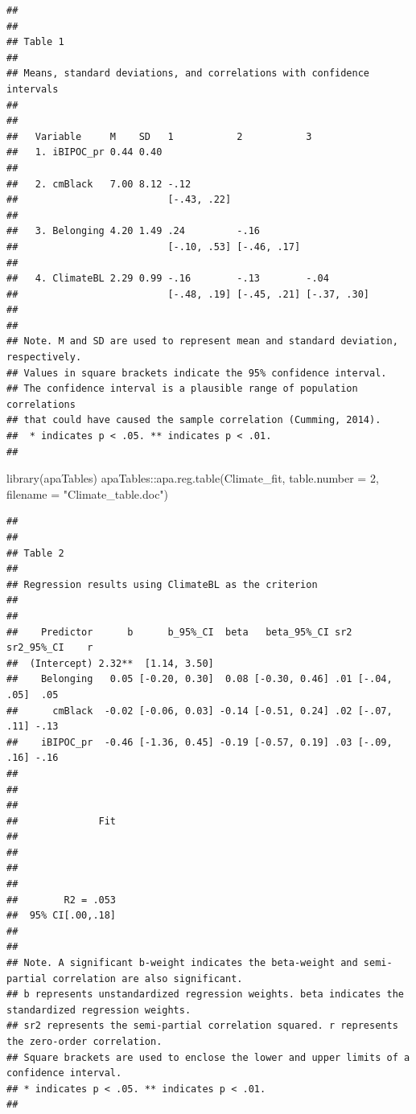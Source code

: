 \documentclass[
  english,
]{book}
\newenvironment{Shaded}{\begin{snugshade}}{\end{snugshade}}
\newcommand{\AttributeTok}[1]{\textcolor[rgb]{0.77,0.63,0.00}{#1}}
\newcommand{\DecValTok}[1]{\textcolor[rgb]{0.00,0.00,0.81}{#1}}
\newcommand{\FunctionTok}[1]{\textcolor[rgb]{0.00,0.00,0.00}{#1}}
\newcommand{\NormalTok}[1]{#1}
\newcommand{\SpecialCharTok}[1]{\textcolor[rgb]{0.00,0.00,0.00}{#1}}
\newcommand{\StringTok}[1]{\textcolor[rgb]{0.31,0.60,0.02}{#1}}
\begin{document}
\begin{verbatim}
## 
## 
## Table 1 
## 
## Means, standard deviations, and correlations with confidence intervals
##  
## 
##   Variable     M    SD   1           2           3          
##   1. iBIPOC_pr 0.44 0.40                                    
##                                                             
##   2. cmBlack   7.00 8.12 -.12                               
##                          [-.43, .22]                        
##                                                             
##   3. Belonging 4.20 1.49 .24         -.16                   
##                          [-.10, .53] [-.46, .17]            
##                                                             
##   4. ClimateBL 2.29 0.99 -.16        -.13        -.04       
##                          [-.48, .19] [-.45, .21] [-.37, .30]
##                                                             
## 
## Note. M and SD are used to represent mean and standard deviation, respectively.
## Values in square brackets indicate the 95% confidence interval.
## The confidence interval is a plausible range of population correlations 
## that could have caused the sample correlation (Cumming, 2014).
##  * indicates p < .05. ** indicates p < .01.
## 
\end{verbatim}

\begin{Shaded}
\begin{Highlighting}[]
\FunctionTok{library}\NormalTok{(apaTables)}
\NormalTok{apaTables}\SpecialCharTok{::}\FunctionTok{apa.reg.table}\NormalTok{(Climate\_fit, }\AttributeTok{table.number =} \DecValTok{2}\NormalTok{, }\AttributeTok{filename =} \StringTok{"Climate\_table.doc"}\NormalTok{)}
\end{Highlighting}
\end{Shaded}

\begin{verbatim}
## 
## 
## Table 2 
## 
## Regression results using ClimateBL as the criterion
##  
## 
##    Predictor      b      b_95%_CI  beta   beta_95%_CI sr2  sr2_95%_CI    r
##  (Intercept) 2.32**  [1.14, 3.50]                                         
##    Belonging   0.05 [-0.20, 0.30]  0.08 [-0.30, 0.46] .01 [-.04, .05]  .05
##      cmBlack  -0.02 [-0.06, 0.03] -0.14 [-0.51, 0.24] .02 [-.07, .11] -.13
##    iBIPOC_pr  -0.46 [-1.36, 0.45] -0.19 [-0.57, 0.19] .03 [-.09, .16] -.16
##                                                                           
##                                                                           
##                                                                           
##              Fit
##                 
##                 
##                 
##                 
##        R2 = .053
##  95% CI[.00,.18]
##                 
## 
## Note. A significant b-weight indicates the beta-weight and semi-partial correlation are also significant.
## b represents unstandardized regression weights. beta indicates the standardized regression weights. 
## sr2 represents the semi-partial correlation squared. r represents the zero-order correlation.
## Square brackets are used to enclose the lower and upper limits of a confidence interval.
## * indicates p < .05. ** indicates p < .01.
## 
\end{verbatim}
\end{document}
